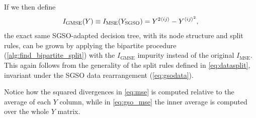 If we then define
%
\begin{equation}
    I_\text{GMSE}(Y) \equiv I_\text{MSE}(Y_\text{SGSO})
        = Y^{2\langle ij\rangle} - Y^{\langle ij\rangle^2}\text{,}
    \label{eq:gso_mse}
\end{equation}
%
the exact same SGSO-adapted decision tree, with its node structure and split rules, can be grown by applying the bipartite procedure (\autoref{alg:find_bipartite_split}) with the $I_\text{GMSE}$ impurity instead of the original $I_\text{MSE}$. This again follows from the generality of the split rules defined in \autoref{eq:datasplit}, invariant under the SGSO data rearrangement (\autoref{eq:gsodata}).


Notice how the squared divergences in \ref{eq:mse} is computed relative to the average of each $Y$ column, while in \ref{eq:gso_mse} the inner average is computed over the whole $Y$ matrix.  %

